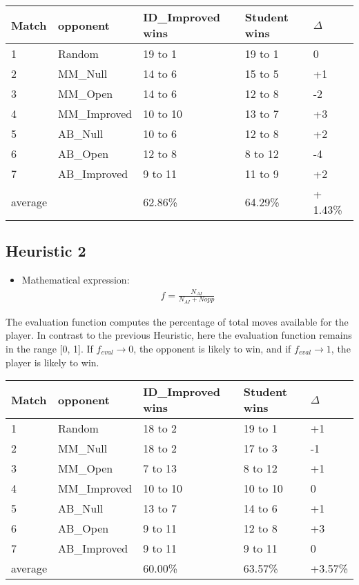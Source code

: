 \documentclass[12pt]{article}
\begin{document}
\begin{table}[H]
\begin{tabular}{|l|l|l|l|l|}
\hline
Match & opponent & ID\_Improved wins & Student wins & $\Delta$\\
\hline
 1 & Random    &	19 to 1 & 19 to 1 & 0 \\
 \hline
  2 & MM\_Null   &	14 to 6 & 15 to 5 & +1 \\
  \hline
  3 &  MM\_Open  & 	14 to 6 & 12 to 8 & -2\\
  \hline
  4 &MM\_Improved &	10 to 10 & 13 to 7 & +3 \\
  \hline
  5 & AB\_Null   & 10 to 6 & 12 to 8 & +2 \\
  \hline 
  6 & AB\_Open  & 	12 to 8 & 8 to 12 & -4\\
  \hline
  7 & AB\_Improved & 9 to 11 & 11 to 9 & +2 \\
  \hline
  average & & 62.86\% & 64.29\% & + 1.43\%\\
  \hline
\end{tabular}
\end{table}


\subsection{Heuristic 2}
\begin{itemize}
\item Mathematical expression:
\begin{align}
f = \frac{N_{AI}}{N_{AI} + N{opp}}
\end{align}
\end{itemize}
The evaluation function computes the percentage of total moves available for the player. In contrast to the previous Heuristic, here the evaluation function remains in the range [0, 1]. If $f_{eval} \rightarrow 0$, the opponent is likely to win, and if $f_{eval} \rightarrow 1$, the player is likely to win.
\begin{table}[H]
\begin{tabular}{|l|l|l|l|l|}
\hline
Match & opponent & ID\_Improved wins & Student wins & $\Delta$\\
\hline
 1 & Random    &	18 to 2 & 19 to 1 & +1 \\
 \hline
  2 & MM\_Null   &	18 to 2 & 17 to 3 & -1\\
  \hline
  3 &  MM\_Open  & 	7 to 13 & 8 to 12 & +1 \\
  \hline
  4 &MM\_Improved &	10 to 10 & 10 to 10 & 0 \\
  \hline
  5 & AB\_Null   & 13 to 7 & 14 to 6 & +1 \\
  \hline 
  6 & AB\_Open  & 	9 to 11 & 12 to 8 & +3 \\
  \hline
  7 & AB\_Improved & 9 to 11 & 9 to 11 & 0\\
  \hline
  average & & 60.00\% & 63.57\% & +3.57\%\\
  \hline
\end{tabular}
\end{table}
\end{document}
